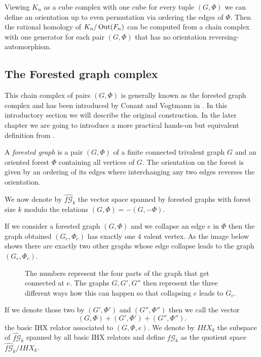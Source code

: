 
Viewing $K_{n}$ as a cube complex with one cube for every tuple $(G,\Phi)$ we can define an orientation up to even permutation
via ordering the edges of $\Phi$. Then the rational homology of $K_{n} / \operatorname{Out}(F_{n})$ can be
computed from a chain complex with one generator for each pair $(G,\Phi)$ that has no orientation
reversing-automorphism.

\subsection{The Forested graph complex}
This chain complex of pairs $(G,\Phi)$ is generally known as the forested graph complex and has been
introduced by Conant and Vogtmann in \cite{conant03}. In this introductory section
we will describe the original construction. In the later chapter we are going to
introduce a more practical hands-on but equivalent definition from \cite{conant08}.

\begin{definition}
	A \emph{forested graph} is a pair $(G,\Phi)$ of a finite connected trivalent graph $G$ and an oriented forest $\Phi$ containing all vertices of $G$.
	The orientation on the forest is given by an ordering of its edges where interchanging any two edges reverses the orientation.
\end{definition}

We now denote by $\widehat{f\mathcal{G}}_{k}$ the vector space spanned by forested graphs with forest size $k$ modulo the relations
$(G,\Phi) = -(G,-\Phi)$.

If we consider a forested graph $(G,\Phi)$ and we collapse an edge $e$ in $\Phi$ then the graph obtained $(G_{e},\Phi_{e})$ 
has exactly one $4$ valent vertex. As the image below shows there are exactly two other graphs
whose edge collapse leads to the graph $(G_{e},\Phi_{e})$.

\begin{figure}[bh]
	\centering
	\captionsetup{width=0.8\textwidth}
	\caption{The numbers represent the four parts of the graph that get connected at $e$.
		The graphs $G,G',G''$ then represent the three different ways how this can happen so that
	collapsing $e$ leads to $G_{e}$.}
\end{figure}

If we denote those two by $(G',\Phi')$ and  $(G'',\Phi'')$ then we call the vector
\[
	(G,\Phi) + (G',\Phi') + (G'',\Phi'')
.\] 
the basic IHX relator associated to $(G,\Phi,e)$. 
We denote by $IHX_{k}$ the subspace of $\widehat{f\mathcal{G}}_{k}$ spanned by all basic IHX relators
and define $f\mathcal{G}_{k}$ as the quotient space $\widehat{f\mathcal{G}}_{k} / IHX_{k}$.

